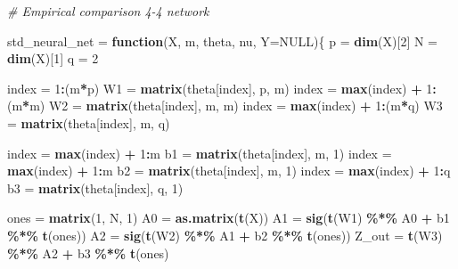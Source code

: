 \documentclass[12pt,halfline,a4paper,]{ouparticle}
\newenvironment{Shaded}{\begin{snugshade}}{\end{snugshade}}
\newcommand{\AttributeTok}[1]{\textcolor[rgb]{0.13,0.29,0.53}{#1}}
\newcommand{\CommentTok}[1]{\textcolor[rgb]{0.56,0.35,0.01}{\textit{#1}}}
\newcommand{\ConstantTok}[1]{\textcolor[rgb]{0.56,0.35,0.01}{#1}}
\newcommand{\ControlFlowTok}[1]{\textcolor[rgb]{0.13,0.29,0.53}{\textbf{#1}}}
\newcommand{\DecValTok}[1]{\textcolor[rgb]{0.00,0.00,0.81}{#1}}
\newcommand{\FunctionTok}[1]{\textcolor[rgb]{0.13,0.29,0.53}{\textbf{#1}}}
\newcommand{\NormalTok}[1]{#1}
\newcommand{\OtherTok}[1]{\textcolor[rgb]{0.56,0.35,0.01}{#1}}
\newcommand{\SpecialCharTok}[1]{\textcolor[rgb]{0.81,0.36,0.00}{\textbf{#1}}}
\begin{document}
\begin{Shaded}
\begin{Highlighting}[]
\CommentTok{\# Empirical comparison 4{-}4 network}

\NormalTok{std\_neural\_net }\OtherTok{=} \ControlFlowTok{function}\NormalTok{(X, m, theta, nu, }\AttributeTok{Y=}\ConstantTok{NULL}\NormalTok{)\{}
\NormalTok{  p }\OtherTok{=} \FunctionTok{dim}\NormalTok{(X)[}\DecValTok{2}\NormalTok{]}
\NormalTok{  N }\OtherTok{=} \FunctionTok{dim}\NormalTok{(X)[}\DecValTok{1}\NormalTok{]}
\NormalTok{  q }\OtherTok{=} \DecValTok{2}
  
\NormalTok{  index }\OtherTok{=} \DecValTok{1}\SpecialCharTok{:}\NormalTok{(m}\SpecialCharTok{*}\NormalTok{p)}
\NormalTok{  W1 }\OtherTok{=} \FunctionTok{matrix}\NormalTok{(theta[index], p, m)}
\NormalTok{  index }\OtherTok{=} \FunctionTok{max}\NormalTok{(index) }\SpecialCharTok{+} \DecValTok{1}\SpecialCharTok{:}\NormalTok{(m}\SpecialCharTok{*}\NormalTok{m)}
\NormalTok{  W2 }\OtherTok{=} \FunctionTok{matrix}\NormalTok{(theta[index], m, m)}
\NormalTok{  index }\OtherTok{=} \FunctionTok{max}\NormalTok{(index) }\SpecialCharTok{+} \DecValTok{1}\SpecialCharTok{:}\NormalTok{(m}\SpecialCharTok{*}\NormalTok{q)}
\NormalTok{  W3 }\OtherTok{=} \FunctionTok{matrix}\NormalTok{(theta[index], m, q)}
  
\NormalTok{  index }\OtherTok{=} \FunctionTok{max}\NormalTok{(index) }\SpecialCharTok{+} \DecValTok{1}\SpecialCharTok{:}\NormalTok{m}
\NormalTok{  b1 }\OtherTok{=} \FunctionTok{matrix}\NormalTok{(theta[index], m, }\DecValTok{1}\NormalTok{)}
\NormalTok{  index }\OtherTok{=} \FunctionTok{max}\NormalTok{(index) }\SpecialCharTok{+} \DecValTok{1}\SpecialCharTok{:}\NormalTok{m}
\NormalTok{  b2 }\OtherTok{=} \FunctionTok{matrix}\NormalTok{(theta[index], m, }\DecValTok{1}\NormalTok{)}
\NormalTok{  index }\OtherTok{=} \FunctionTok{max}\NormalTok{(index) }\SpecialCharTok{+} \DecValTok{1}\SpecialCharTok{:}\NormalTok{q}
\NormalTok{  b3 }\OtherTok{=} \FunctionTok{matrix}\NormalTok{(theta[index], q, }\DecValTok{1}\NormalTok{)}
  
\NormalTok{  ones }\OtherTok{=} \FunctionTok{matrix}\NormalTok{(}\DecValTok{1}\NormalTok{, N, }\DecValTok{1}\NormalTok{)}
\NormalTok{  A0 }\OtherTok{=} \FunctionTok{as.matrix}\NormalTok{(}\FunctionTok{t}\NormalTok{(X))}
\NormalTok{  A1 }\OtherTok{=} \FunctionTok{sig}\NormalTok{(}\FunctionTok{t}\NormalTok{(W1) }\SpecialCharTok{\%*\%}\NormalTok{ A0 }\SpecialCharTok{+}\NormalTok{ b1 }\SpecialCharTok{\%*\%} \FunctionTok{t}\NormalTok{(ones))}
\NormalTok{  A2 }\OtherTok{=} \FunctionTok{sig}\NormalTok{(}\FunctionTok{t}\NormalTok{(W2) }\SpecialCharTok{\%*\%}\NormalTok{ A1 }\SpecialCharTok{+}\NormalTok{ b2 }\SpecialCharTok{\%*\%} \FunctionTok{t}\NormalTok{(ones))}
\NormalTok{  Z\_out }\OtherTok{=} \FunctionTok{t}\NormalTok{(W3) }\SpecialCharTok{\%*\%}\NormalTok{ A2 }\SpecialCharTok{+}\NormalTok{ b3 }\SpecialCharTok{\%*\%} \FunctionTok{t}\NormalTok{(ones)}
  

\end{Highlighting}
\end{Shaded}
\end{document}

